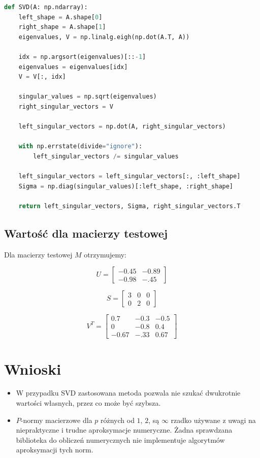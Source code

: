 \documentclass[a4paper]{article}
\begin{document}
\begin{lstlisting}[language=python]
def SVD(A: np.ndarray):
    left_shape = A.shape[0]
    right_shape = A.shape[1]
    eigenvalues, V = np.linalg.eigh(np.dot(A.T, A))

    idx = np.argsort(eigenvalues)[::-1]
    eigenvalues = eigenvalues[idx]
    V = V[:, idx]

    singular_values = np.sqrt(eigenvalues)
    right_singular_vectors = V

    left_singular_vectors = np.dot(A, right_singular_vectors)

    with np.errstate(divide="ignore"):
        left_singular_vectors /= singular_values

    left_singular_vectors = left_singular_vectors[:, :left_shape]
    Sigma = np.diag(singular_values)[:left_shape, :right_shape]

    return left_singular_vectors, Sigma, right_singular_vectors.T

\end{lstlisting}

\subsection{Wartość dla macierzy testowej}

Dla macierzy testowej $M$ otrzymujemy:

\[
    U =
\begin{bmatrix}
    -0.45 & -0.89\\
    -0.98 & -.45
\end{bmatrix}
\]

\[
    S =
\begin{bmatrix}
    3 & 0 & 0\\
    0 & 2 & 0
\end{bmatrix}
\]

\[
    V^T =
\begin{bmatrix}
    0.7 & -0.3 & -0.5\\
    0 & -0.8 & 0.4\\
    -0.67 & -.33  & 0.67
\end{bmatrix}
\]

\section{Wnioski}

\begin{itemize}
    \item  W przypadku SVD zastosowana metoda pozwala nie szukać dwukrotnie wartości własnych, przez co może być szybsza.
    \item $P$-normy macierzowe dla $p$ różnych od $1$, $2$, są $\infty$ rzadko używane z uwagi na niepraktyczne i trudne aproksymacje numeryczne. Żadna sprawdzana biblioteka do obliczeń numerycznych nie implementuje algorytmów aproksymacji tych norm.
\end{itemize}
\end{document}
